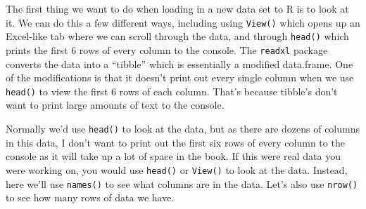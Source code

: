\documentclass[
]{krantz}
\begin{document}
The first thing we want to do when loading in a new data set
to R is to look at it. We can do this a few different ways,
including using \texttt{View()} which opens up an Excel-like
tab where we can scroll through the data, and through
\texttt{head()} which prints the first 6 rows of every
column to the console. The \texttt{readxl} package converts
the data into a ``tibble'' which is essentially a modified
data.frame. One of the modifications is that it doesn't
print out every single column when we use \texttt{head()} to
view the first 6 rows of each column. That's because
tibble's don't want to print large amounts of text to the
console.

Normally we'd use \texttt{head()} to look at the data, but
as there are dozens of columns in this data, I don't want to
print out the first six rows of every column to the console
as it will take up a lot of space in the book. If this were
real data you were working on, you would use \texttt{head()}
or \texttt{View()} to look at the data. Instead, here we'll
use \texttt{names()} to see what columns are in the data.
Let's also use \texttt{nrow()} to see how many rows of data
we have.
\end{document}
